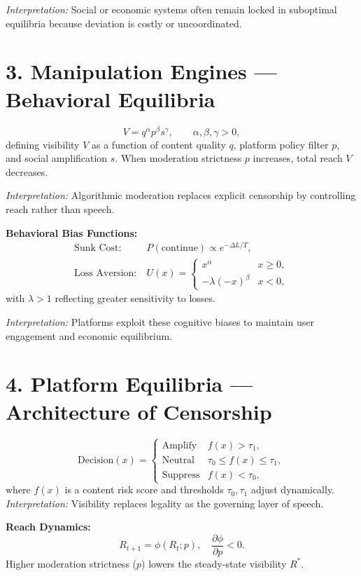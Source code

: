 \documentclass[12pt,twoside]{book}
\begin{document}
\emph{Interpretation:} Social or economic systems often remain locked in suboptimal equilibria because deviation is costly or uncoordinated.

\section*{3. Manipulation Engines — Behavioral Equilibria}
\[
V = q^{\alpha}p^{\beta}s^{\gamma}, \qquad \alpha,\beta,\gamma > 0,
\]
defining visibility \(V\) as a function of content quality \(q\), platform policy filter \(p\), and social amplification \(s\).  
When moderation strictness \(p\) increases, total reach \(V\) decreases.

\emph{Interpretation:} Algorithmic moderation replaces explicit censorship by controlling reach rather than speech.

\medskip
\noindent
\textbf{Behavioral Bias Functions:}
\begin{align*}
\text{Sunk Cost:}\ & P(\text{continue}) \propto e^{-\Delta L/T},\\
\text{Loss Aversion:}\ & U(x) =
\begin{cases}
x^\alpha & x \ge 0,\\
-\lambda (-x)^\beta & x < 0,
\end{cases}
\end{align*}
with \(\lambda > 1\) reflecting greater sensitivity to losses.

\emph{Interpretation:} Platforms exploit these cognitive biases to maintain user engagement and economic equilibrium.

\section*{4. Platform Equilibria — Architecture of Censorship}
\[
\text{Decision}(x)=
\begin{cases}
\text{Amplify} & f(x)>\tau_1,\\
\text{Neutral} & \tau_0\le f(x)\le\tau_1,\\
\text{Suppress} & f(x)<\tau_0,
\end{cases}
\]
where \(f(x)\) is a content risk score and thresholds \(\tau_0,\tau_1\) adjust dynamically.  
\emph{Interpretation:} Visibility replaces legality as the governing layer of speech.

\medskip
\noindent
\textbf{Reach Dynamics:}
\[
R_{t+1} = \phi(R_t; p), \quad \frac{\partial \phi}{\partial p}<0.
\]
Higher moderation strictness (\(p\)) lowers the steady-state visibility \(R^*\).
\end{document}

